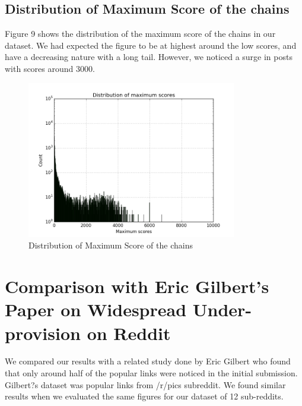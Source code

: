 \documentclass{article} %
\begin{document}
\subsection{Distribution of Maximum Score of the chains}

Figure 9 shows the distribution of the maximum score of the chains in our dataset. We had expected the figure to be at highest around the low scores, and have a decreasing nature with a long tail. However, we noticed a surge in posts with scores around 3000.

\begin{figure}[h]
\begin{center}
\includegraphics[width=3.6in]{max_score_distribution.png}
\caption{Distribution of Maximum Score of the chains}
\end{center}
\end{figure}

\newpage


\section{Comparison with Eric Gilbert's Paper on Widespread Under-provision on Reddit}

We compared our results with a related study done by Eric Gilbert who found that only around half of the popular links were noticed in the initial submission. Gilbert?s dataset was popular links from /r/pics subreddit. We found similar results when we evaluated the same figures for our dataset of 12 sub-reddits.
\end{document}
